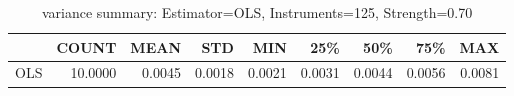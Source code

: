 \begin{table}[ht]
\centering
\caption{variance summary: Estimator=OLS, Instruments=125, Strength=0.70}
\begin{tabular}{lrrrrrrrr}
\toprule
 & COUNT & MEAN & STD & MIN & 25\% & 50\% & 75\% & MAX \\
\midrule
OLS & 10.0000 & 0.0045 & 0.0018 & 0.0021 & 0.0031 & 0.0044 & 0.0056 & 0.0081 \\
\bottomrule
\end{tabular}
\end{table}
